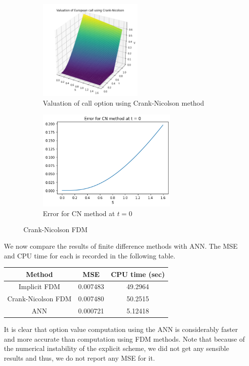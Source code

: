 \documentclass[12pt,a4paper]{article}
\begin{document}
\begin{figure}[H]
\begin{subfigure}{0.5\textwidth}
\includegraphics[width=0.9\linewidth, height=5cm]{CN_option_value.png} 
\caption{Valuation of call option using Crank-Nicolson method}
\label{fig:subim1 CN sol}
\end{subfigure}
\begin{subfigure}{0.5\textwidth}
\includegraphics[width=0.9\linewidth, height=5cm]{CN_error.png}
\caption{Error for CN method at $t = 0$}
\label{fig:subim2 CN err}
\end{subfigure}

\caption{Crank-Nicolson FDM}
\label{fig:CN scheme}
\end{figure}
We now compare the results of finite difference methods with ANN.
The MSE and CPU time for each is recorded in the following table.

\begin{center}
\begin{tabular}{ |c|c|c| } 
 \hline
 Method & MSE & CPU time (sec) \\ 
 \hline
 Implicit FDM & 0.007483 & 49.2964 \\ 
 Crank-Nicolson FDM & 0.007480 & 50.2515 \\
 ANN & 0.000721 & 5.12418 \\ 
 \hline
\end{tabular}
\end{center}

It is clear that option value computation using the ANN is considerably faster and more accurate than computation using FDM methods. Note that because of the numerical
instability of the explicit scheme, we did not get any sensible results and thus, we do
not report any MSE for it.
\end{document}
